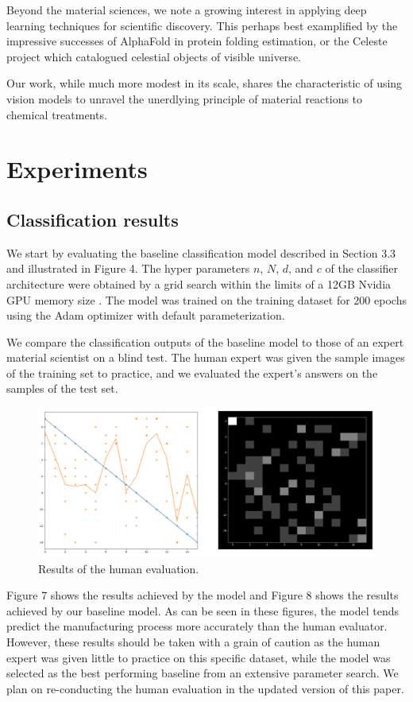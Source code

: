 \documentclass[10pt,twocolumn,letterpaper]{article}
\begin{document}
Beyond the material sciences, we note a growing interest in applying deep learning techniques
for scientific discovery. 
This perhaps best examplified by the impressive successes of AlphaFold \cite{evans2018novo} in protein folding estimation,
or the Celeste \cite{regier2015celeste} project which catalogued celestial objects of visible universe.

Our work, while much more modest in its scale, 
shares the characteristic of using vision models to unravel
the unerdlying principle of material reactions to chemical treatments.

\section{Experiments}

\subsection{Classification results}
% 
We start by evaluating the baseline classification model described in Section 3.3 and illustrated in Figure 4.
The hyper parameters $n$, $N$, $d$, and $c$ of the classifier architecture 
were obtained by a grid search within the limits of a 12GB Nvidia GPU memory size .
The model was trained on the training dataset for 200 epochs using the Adam optimizer with default parameterization.

We compare the classification outputs of the baseline model to those 
of an expert material scientist on a blind test.
The human expert was given the sample images of the training set to practice,
and we evaluated the expert's answers on the samples of the test set.

\begin{figure}[h]
	\centering
	\includegraphics[width=0.9\linewidth]{"./figures/Figure7"}
	\caption{
		Results of the human evaluation.
	}
\end{figure}

Figure 7 shows the results achieved by the model and Figure 8 shows the results achieved by our baseline model.
As can be seen in these figures, the model tends predict the manufacturing 
process more accurately than the human evaluator.
However, these results should be taken with a grain of caution 
as the human expert was given little to practice on this specific dataset,
while the model was selected as the best performing baseline from an extensive parameter search.
We plan on re-conducting the human evaluation in the updated version of this paper.
\end{document}

